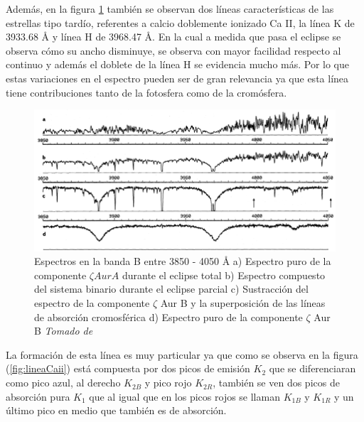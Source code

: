 \documentclass[12pt,oneside,openany,letter]{book}
\begin{document}
\noindent Además, en la figura \ref{fig:espectro_zaur} también se observan dos líneas características de las estrellas tipo tardío, referentes a calcio doblemente ionizado Ca II, la línea K de 3933.68 \r{A} y línea H de 3968.47 \r{A}. En la cual a medida que pasa el eclipse se observa cómo su ancho disminuye, se observa con mayor facilidad respecto al continuo y además el doblete de la línea H se evidencia mucho más. Por lo que estas variaciones en el espectro pueden ser de gran relevancia ya que esta línea tiene contribuciones tanto de la fotosfera como de la cromósfera.


\begin{figure}[h]
    \centering
    \includegraphics[width=1\linewidth]{Images/espectro_zeta_aur.PNG}
    \caption{Espectros en la banda B entre 3850 - 4050 \r{A} a) Espectro puro de la componente $\zeta Aur A$ durante el eclipse total b) Espectro compuesto del sistema binario durante el eclipse parcial c) Sustracción del espectro de la componente $\zeta$ Aur B y la superposición de las líneas de absorción cromosférica d) Espectro puro de la componente $\zeta$ Aur B \textit{Tomado de \citep{kps9}}}
    \label{fig:espectro_zaur}
\end{figure}

\noindent La formación de esta línea es muy particular ya que como se observa en la figura (\ref{fig:lineaCaii}) está compuesta por dos picos de emisión $K_2$ que se diferenciaran como pico azul, al derecho $K_{2B}$ y pico rojo $K_{2R}$, también se ven dos picos de absorción pura $K_1$ que al igual que en los picos rojos se llaman $K_{1B}$ y $K_{1R}$ y un último pico en medio que también es de absorción.
\end{document}
